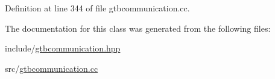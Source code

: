 Definition at line 344 of file gtbcommunication.\-cc.



The documentation for this class was generated from the following files\-:\begin{DoxyCompactItemize}
\item 
include/\hyperlink{gtbcommunication_8hpp}{gtbcommunication.\-hpp}\item 
src/\hyperlink{gtbcommunication_8cc}{gtbcommunication.\-cc}\end{DoxyCompactItemize}
